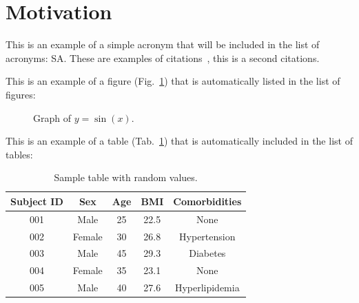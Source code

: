 \section{Motivation} 
\label{sec:introduction:motivation}

This is an example of a simple acronym that will be included in the list of acronyms: \ac{SA}. These are examples of citations~\cite{smith2020,chen2022,liu2017,miller2020, zhang2016}, this is a second citations\cite{jackson2023,wang2019,nguyen2021,thomas2019,wilson2018}.

This is an example of a figure (Fig.~\ref{fig:motivation:sample_figure}) that is automatically listed in the list of figures:

\begin{figure}[htbp]
    \centering
    \caption{Graph of $y = \sin(x)$.}
    \label{fig:motivation:sample_figure}
\end{figure}

This is an example of a table (Tab.~\ref{tab:motivation:sample_table}) that is automatically included in the list of tables:

\begin{table}[htbp]
    \centering
    \begin{tabular}{|c|c|c|c|c|}
        \hline
        \rowcolor{lightgray}
        Subject ID & Sex & Age & BMI & Comorbidities \\
        \hline
        001 & Male & 25 & 22.5 & None \\
        002 & Female & 30 & 26.8 & Hypertension \\
        003 & Male & 45 & 29.3 & Diabetes \\
        004 & Female & 35 & 23.1 & None \\
        005 & Male & 40 & 27.6 & Hyperlipidemia \\
        \hline
    \end{tabular}
    \caption{Sample table with random values.}
    \label{tab:motivation:sample_table}
\end{table}


